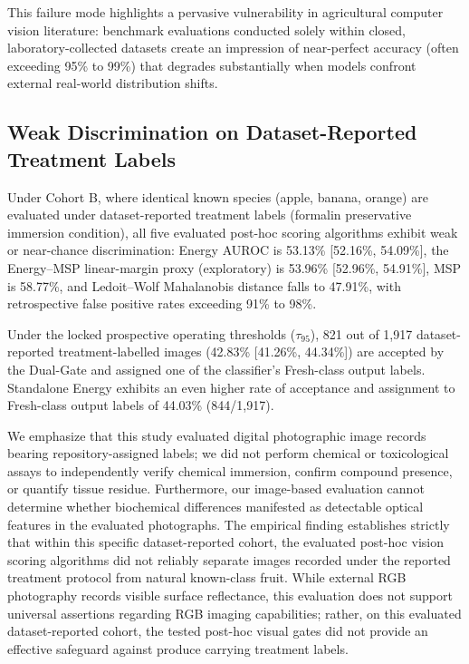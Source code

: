 This failure mode highlights a pervasive vulnerability in agricultural computer vision literature: benchmark evaluations conducted solely within closed, laboratory-collected datasets create an impression of near-perfect accuracy (often exceeding 95\% to 99\%) that degrades substantially when models confront external real-world distribution shifts.

\vspace*{-7pt}\subsection{Weak Discrimination on Dataset-Reported Treatment Labels}
\vspace*{-2pt}
\label{sec:discussion_chemical_immersion}

Under Cohort B, where identical known species (apple, banana, orange) are evaluated under dataset-reported treatment labels (formalin preservative immersion condition), all five evaluated post-hoc scoring algorithms exhibit weak or near-chance discrimination: Energy AUROC is 53.13\% [52.16\%, 54.09\%], the Energy--MSP linear-margin proxy (exploratory) is 53.96\% [52.96\%, 54.91\%], MSP is 58.77\%, and Ledoit--Wolf Mahalanobis distance falls to 47.91\%, with retrospective false positive rates exceeding 91\% to 98\%.

Under the locked prospective operating thresholds ($\tau_{95}$), 821 out of 1,917 dataset-reported treatment-labelled images (42.83\% [41.26\%, 44.34\%]) are accepted by the Dual-Gate and assigned one of the classifier's Fresh-class output labels. Standalone Energy exhibits an even higher rate of acceptance and assignment to Fresh-class output labels of 44.03\% (844/1,917).

We emphasize that this study evaluated digital photographic image records bearing repository-assigned labels; we did not perform chemical or toxicological assays to independently verify chemical immersion, confirm compound presence, or quantify tissue residue. Furthermore, our image-based evaluation cannot determine whether biochemical differences manifested as detectable optical features in the evaluated photographs. The empirical finding establishes strictly that within this specific dataset-reported cohort, the evaluated post-hoc vision scoring algorithms did not reliably separate images recorded under the reported treatment protocol from natural known-class fruit. While external RGB photography records visible surface reflectance, this evaluation does not support universal assertions regarding RGB imaging capabilities; rather, on this evaluated dataset-reported cohort, the tested post-hoc visual gates did not provide an effective safeguard against produce carrying treatment labels.

